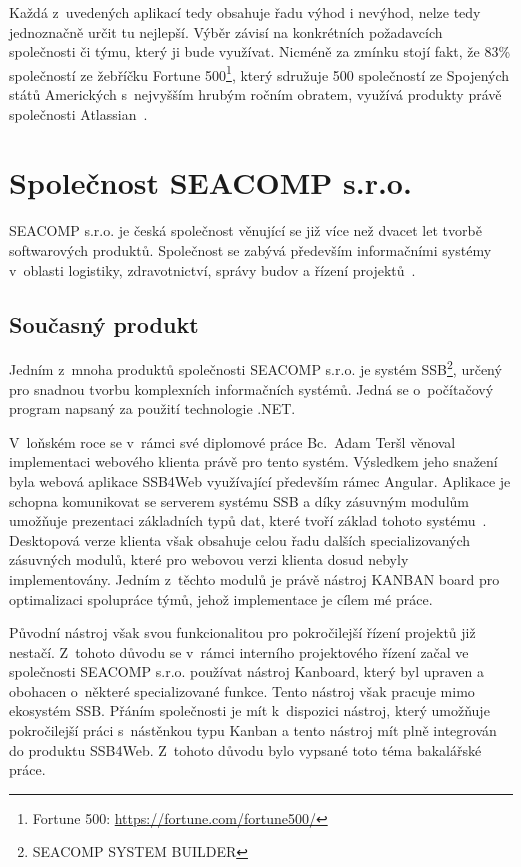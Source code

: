 Každá z~uvedených aplikací tedy obsahuje řadu výhod i nevýhod, nelze tedy jednoznačně určit tu nejlepší. Výběr závisí na konkrétních požadavcích společnosti či týmu, který ji bude využívat. Nicméně za zmínku stojí fakt, že 83\% společností ze žebříčku Fortune 500\footnote{Fortune 500: \url{https://fortune.com/fortune500/}}, který sdružuje 500 společností ze Spojených států Amerických s~nejvyšším hrubým ročním obratem, využívá produkty právě společnosti Atlassian~\cite{bib:atlassian-customers}.



\section{Společnost SEACOMP s.r.o.}
SEACOMP s.r.o. je česká společnost věnující se již více než dvacet let tvorbě softwarových produktů. Společnost se zabývá především informačními systémy v~oblasti logistiky, zdravotnictví, správy budov a řízení projektů~\cite{bib:seacomp-portfolio}.


\subsection{Současný produkt}
Jedním z~mnoha produktů společnosti SEACOMP s.r.o. je systém SSB\footnote{SEACOMP SYSTEM BUILDER}, určený pro snadnou tvorbu komplexních informačních systémů. Jedná se o~počítačový program napsaný za použití technologie .NET.

V~loňském roce se v~rámci své diplomové práce Bc.~Adam Teršl věnoval implementaci webového klienta právě pro tento systém. Výsledkem jeho snažení byla webová aplikace SSB4Web využívající především rámec Angular. Aplikace je schopna komunikovat se serverem systému SSB a díky zásuvným modulům umožňuje prezentaci základních typů dat, které tvoří základ tohoto systému~\cite{bib:tersl}. Desktopová verze klienta však obsahuje celou řadu dalších specializovaných zásuvných modulů, které pro webovou verzi klienta dosud nebyly implementovány. Jedním z~těchto modulů je právě nástroj KANBAN board pro optimalizaci spolupráce týmů, jehož implementace je cílem mé práce. 

Původní nástroj však svou funkcionalitou pro pokročilejší řízení projektů již nestačí. Z~tohoto důvodu se v~rámci interního projektového řízení začal ve společnosti SEACOMP s.r.o. používat nástroj Kanboard, který byl upraven a obohacen o~některé specializované funkce. Tento nástroj však pracuje mimo ekosystém SSB. Přáním společnosti je mít k~dispozici nástroj, který umožňuje pokročilejší práci s~nástěnkou typu Kanban a tento nástroj mít plně integrován do produktu SSB4Web. Z~tohoto důvodu bylo vypsané toto téma bakalářské práce.


